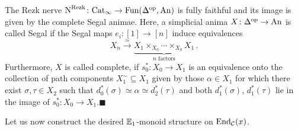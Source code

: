 \begin{thm}\label{thm:RezkNerve}
	The Rezk nerve $\N^\mathrm{Rezk}\colon \cat{Cat}_\infty\rightarrow \Fun(\IDelta^\op,\cat{An})$ is fully faithful and its image is given by the complete Segal animae. Here, a simplicial anima $X\colon \IDelta^\op\rightarrow \cat{An}$ is called Segal if the Segal maps $e_i\colon [1]\rightarrow [n]$ induce equivalences
	\begin{equation*}
		X_n\overset{\simeq}{\longrightarrow} \underbrace{X_1\times_{X_0}\dotsb\times_{X_0}X_1}_{n\text{ factors}}\,.
	\end{equation*}
	Furthermore, $X$ is called complete, if $s_0^*\colon X_0\rightarrow X_1$ is an equivalence onto the collection of path components $X_1^\sim\subseteq X_1$ given by those $\alpha\in X_1$ for which there exist $\sigma,\tau\in X_2$ such that $d_0^*(\sigma)\simeq \alpha\simeq d_2^*(\tau)$ and both $d_1^*(\sigma)$, $d_1^*(\tau)$ lie in the image of $s_0^*\colon X_0\rightarrow X_1$.\hfill$\blacksquare$
\end{thm}
Let us now construct the desired $\mathbb{E}_1$-monoid structure on $\operatorname{End}_{\mathcal{C}}(x)$.
